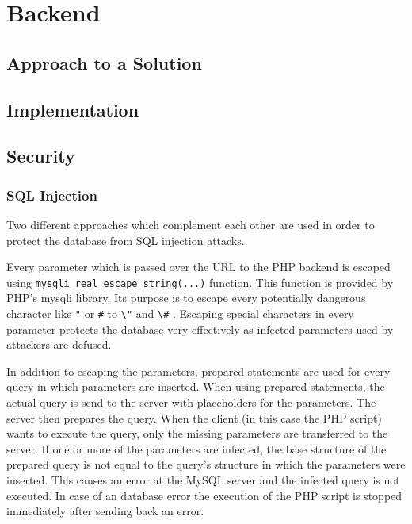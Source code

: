 \chapter{Backend}

\section{Approach to a Solution}
\lipsum

\section{Implementation}
\lipsum

\section{Security}
\subsection{SQL Injection}
Two different approaches which complement each other are used in order to protect the database from SQL injection attacks. 

Every parameter which is passed over the URL to the PHP backend is escaped using \texttt{mysqli\_real\_escape\_string(...)} function. This function is provided by PHP's mysqli library. Its purpose is to escape every potentially dangerous character like \texttt{"} or \texttt{\#} to \texttt{\textbackslash"} and \texttt{\textbackslash\#} . Escaping special characters in every parameter protects the database very effectively as infected parameters used by attackers are defused.

In addition to escaping the parameters, prepared statements are used for every query in which parameters are inserted. When using prepared statements, the actual query is send to the server with placeholders for the parameters. The server then prepares the query. When the client (in this case the PHP script) wants to execute the query, only the missing parameters are transferred to the server. If one or more of the parameters are infected, the base structure of the prepared query is not  equal to the query's structure in which the parameters were inserted. This causes an error at the MySQL server and the infected query is not executed. In case of an database error the execution of the PHP script is stopped immediately after sending back an error.

